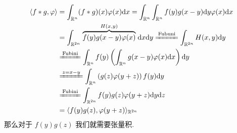 \documentclass[11pt]{ctexart}[UTF8]
\begin{document}
\begin{equation*}
    \begin{aligned}
        \langle f * g, \varphi \rangle & = \int_{\mathbb{R}^{n}} (f * g)(x) \varphi(x) \mathrm{d}x = \int_{\mathbb{R}^{n}} \int_{\mathbb{R}^{n}} f(y) g(x-y) \mathrm{d}y \varphi(x) \mathrm{d}x\\
        & =  \int_{\mathbb{R}^{2n}} \stackrel{H(x,y)}{\overbrace{f(y)  g(x-y) \varphi(x)}}  \mathrm{d}x \mathrm{d}y \xlongequal{\mathrm{Fubuni}} \int_{\mathbb{R}^{2n}} H(x,y) \mathrm{d}y\\
        & \xlongequal{\mathrm{Fubini}}  \int_{\mathbb{R}^{n}} f(y) \left( \int_{\mathbb{R}^{n}} g(x-y) \varphi(x) \mathrm{d}x\right) \mathrm{d}y \\
        & \xlongequal{z=x-y} \int_{\mathbb{R}^{n}}\left( g(z)\varphi(y+z) \right)f(y) \mathrm{d}y \\
        & \xlongequal{\text{Fubini}} \int_{\mathbb{R}^{2n}}f(y)g(z)\varphi(y+z) \mathrm{d}y \mathrm{d}z \\
        & =  \langle f(y)g(z), \varphi(y+z) \rangle_{\mathbb{R}^{2n}}
    \end{aligned}
\end{equation*}
那么对于 $f(y)g(z)$ 我们就需要张量积.
\end{document}
